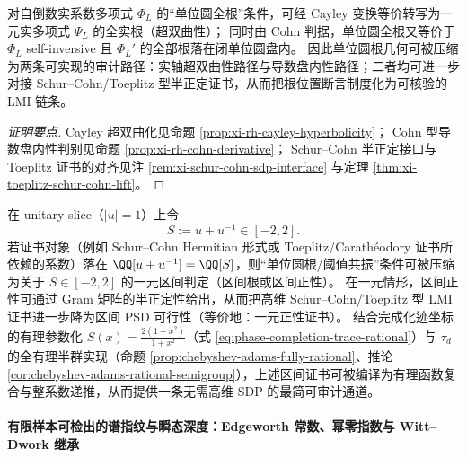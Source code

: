 \begin{conclusion}\label{con:xi-cayley-cohn-lmi-certificate-chain}
对自倒数实系数多项式 \(\Phi_L\) 的“单位圆全根”条件，可经 Cayley 变换等价转写为一元实多项式 \(\Psi_L\) 的全实根（超双曲性）；
同时由 Cohn 判据，单位圆全根又等价于 \(\Phi_L\) self-inversive 且 \(\Phi_L'\) 的全部根落在闭单位圆盘内。
因此单位圆根几何可被压缩为两条可实现的审计路径：实轴超双曲性路径与导数盘内性路径；二者均可进一步对接 Schur--Cohn/Toeplitz 型半正定证书，从而把根位置断言制度化为可核验的 LMI 链条。
\end{conclusion}
\begin{proof}[证明要点]
Cayley 超双曲化见命题 \ref{prop:xi-rh-cayley-hyperbolicity}；
Cohn 型导数盘内性判别见命题 \ref{prop:xi-rh-cohn-derivative}；
Schur--Cohn 半正定接口与 Toeplitz 证书的对齐见注 \ref{rem:xi-schur-cohn-sdp-interface} 与定理 \ref{thm:xi-toeplitz-schur-cohn-lift}。
\end{proof}

\begin{conclusion}\label{con:xi-threshold-resonance-interval-psd-compression}
在 unitary slice（\(|u|=1\)）上令
\[
S:=u+u^{-1}\in[-2,2].
\]
若证书对象（例如 Schur--Cohn Hermitian 形式或 Toeplitz/Carath\'eodory 证书所依赖的系数）落在 \(\QQ[u+u^{-1}]=\QQ[S]\)，则“单位圆根/阈值共振”条件可被压缩为关于 \(S\in[-2,2]\) 的一元区间判定（区间根或区间正性）。
在一元情形，区间正性可通过 Gram 矩阵的半正定性给出，从而把高维 Schur--Cohn/Toeplitz 型 LMI 证书进一步降为区间 PSD 可行性（等价地：一元正性证书）。
结合完成化迹坐标的有理参数化 \(S(x)=\frac{2(1-x^2)}{1+x^2}\)（式 \eqref{eq:phase-completion-trace-rational}）与 \(\tau_d\) 的全有理半群实现（命题 \ref{prop:chebyshev-adams-fully-rational}、推论 \ref{cor:chebyshev-adams-rational-semigroup}），上述区间证书可被编译为有理函数复合与整系数递推，从而提供一条无需高维 SDP 的最简可审计通道。
\end{conclusion}





\paragraph{有限样本可检出的谱指纹与瞬态深度：Edgeworth 常数、幂零指数与 Witt--Dwork 继承}

